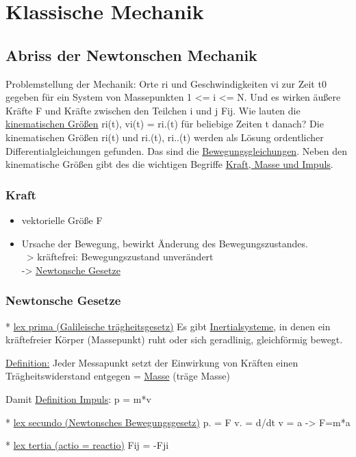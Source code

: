 \section{Klassische Mechanik}
\subsection{Abriss der Newtonschen Mechanik}
Problemstellung der Mechanik:
Orte ri und Geschwindigkeiten vi zur Zeit t0 gegeben für ein System von Massepunkten 1 <= i <= N. Und es wirken äußere Kräfte F und Kräfte zwischen den Teilchen i und j Fij.
Wie lauten die \underline{kinematischen Größen} ri(t), vi(t) = ri.(t) für beliebige Zeiten t danach?
Die kinematischen Größen ri(t) und ri.(t), ri..(t) werden als Lösung ordentlicher Differentialgleichungen gefunden. Das sind die \underline{Bewegungsgleichungen}.
Neben den kinematische Größen gibt des die wichtigen Begriffe \underline{Kraft, Masse und Impuls}.

\subsubsection{Kraft}
\begin{itemize}
  \item vektorielle Größe F
  \item Ursache der Bewegung, bewirkt Änderung des Bewegungszustandes.\\
        ~> kräftefrei: Bewegungszustand unverändert\\
        -> \underline{Newtonsche Gesetze}
\end{itemize}

\subsubsection{Newtonsche Gesetze}
* \underline{lex prima (Galileische trägheitsgesetz)}
Es gibt \underline{Inertialsysteme}, in denen ein kräftefreier Körper (Massepunkt) ruht oder sich geradlinig, gleichförmig bewegt.

\underline{Definition:} Jeder Messapunkt setzt der Einwirkung von Kräften einen Trägheitswiderstand entgegen = \underline{Masse} (träge Masse)

Damit \underline{Definition Impuls}:
p = m*v

* \underline{lex secundo (Newtonsches Bewegungsgesetz)}
p. = F
v. = d/dt v = a -> F=m*a

* \underline{lex tertia (actio = reactio)}
Fij = -Fji

